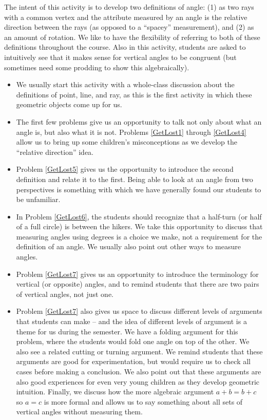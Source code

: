 \documentclass[nooutcomes]{ximera}
\begin{document}
\begin{instructorNotes}
The intent of this activity is to develop two definitions of angle:
(1) as two rays with a common vertex and the attribute measured by an angle is the relative direction between the rays (as opposed to a ``spacey'' measurement), and (2) as an amount of rotation.  We like to have the flexibility of referring to both of these definitions throughout the course.  Also in this activity, students are asked to intuitively see that it makes sense for vertical angles to be congruent (but sometimes need some prodding to show this algebraically).

\begin{itemize}
    \item We usually start this activity with a whole-class discussion about the definitions of point, line, and ray, as this is the first activity in which these geometric objects come up for us.
    \item The first few problems give us an opportunity to talk not only about what an angle is, but also what it is not.  Problems \ref{GetLost1} through \ref{GetLost4} allow us to bring up some children's misconceptions as we develop the ``relative direction'' idea.
    \item Problem \ref{GetLost5} gives us the opportunity to introduce the second definition and relate it to the first.  Being able to look at an angle from two perspectives is something with which we have generally found our students to be unfamiliar.
    \item In Problem \ref{GetLost6}, the students should recognize that a half-turn (or half of a full circle) is between the hikers.  We take this opportunity to discuss that measuring angles using degrees is a choice we make, not a requirement for the definition of an angle.  We usually also point out other ways to measure angles.
    \item Problem \ref{GetLost7} gives us an opportunity to introduce the terminology for vertical (or opposite) angles, and to remind students that there are two pairs of vertical angles, not just one.
    \item Problem \ref{GetLost7} also gives us space to discuss different levels of arguments that students can make -- and the idea of different levels of argument is a theme for us during the semester.  We have a folding argument for this problem, where the students would fold one angle on top of the other.  We also see a related cutting or turning argument.  We remind students that these arguments are good for experimentation, but would require us to check all cases before making a conclusion.  We also point out that these arguments are also good experiences for even very young children as they develop geometric intuition.  Finally, we discuss how the more algebraic argument $a+b = b+c$ so $a = c$ is more formal and allows us to say something about all sets of vertical angles without measuring them.
\end{itemize}

\end{instructorNotes}
\end{document}

